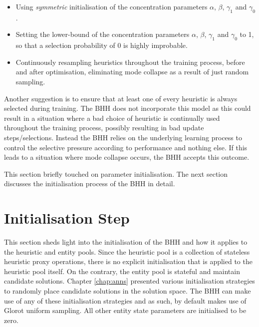 \begin{itemize}
      \item Using \textit{symmetric} initialisation of the concentration parameters $\alpha$, $\beta$, $\gamma_{1}$ and $\gamma_{0}$.

      \item Setting the lower-bound of the concentration parameters $\alpha$, $\beta$, $\gamma_{1}$ and $\gamma_{0}$ to 1, so that a selection probability of 0 is highly improbable.

      \item Continuously resampling heuristics throughout the training process, before and after optimisation, eliminating mode collapse as a result of just random sampling.
\end{itemize}

Another suggestion is to ensure that at least one of every heuristic is always selected during training. The \ac{BHH} does not incorporate this model as this could result in a situation where a bad choice of heuristic is continually used throughout the training process, possibly resulting in bad update steps/selections. Instead the \ac{BHH} relies on the underlying learning process to control the selective pressure according to performance and nothing else. If this leads to a situation where mode collapse occurs, the \ac{BHH} accepts this outcome.

This section briefly touched on parameter initialisation. The next section discusses the initialisation process of the \ac{BHH} in detail.

\section{Initialisation Step}
\label{sec:bhh:initialisation_step}

This section sheds light into the initialisation of the \ac{BHH} and how it applies to the heuristic and entity pools. Since the heuristic pool is a collection of stateless heuristic proxy operations, there is no explicit initialisation that is applied to the heuristic pool itself. On the contrary, the entity pool is stateful and maintain candidate solutions. Chapter \ref{chap:anns} presented various initialisation strategies to randomly place candidate solutions in the solution space. The \ac{BHH} can make use of any of these initialisation strategies and as such, by default makes use of Glorot uniform sampling. All other entity state parameters are initialised to be zero.

